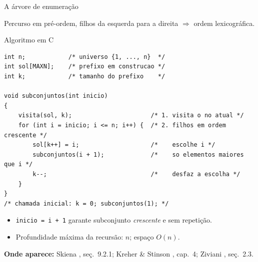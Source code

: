 \documentclass[aspectratio=169]{beamer}
\newcommand{\fonte}[1]{%
  \par\vspace{1pt}%
  {\tiny\color{gray!30!black}\textbf{Onde aparece:} #1\par}}
\begin{document}
\begin{frame}{A árvore de enumeração}
  \begin{center}
  \end{center}
  \begin{center}\small
    Percurso em pré-ordem, filhos da esquerda para a direita $\Rightarrow$ ordem lexicográfica.
  \end{center}
\end{frame}

\begin{frame}[fragile]{Algoritmo em C}
\begin{lstlisting}[style=estiloCmini]
int n;            /* universo {1, ..., n}  */
int sol[MAXN];    /* prefixo em construcao */
int k;            /* tamanho do prefixo    */

void subconjuntos(int inicio)
{
    visita(sol, k);                      /* 1. visita o no atual */
    for (int i = inicio; i <= n; i++) {  /* 2. filhos em ordem crescente */
        sol[k++] = i;                    /*    escolhe i */
        subconjuntos(i + 1);             /*    so elementos maiores que i */
        k--;                             /*    desfaz a escolha */
    }
}
/* chamada inicial: k = 0; subconjuntos(1); */
\end{lstlisting}
  \begin{itemize}
    \item \texttt{inicio = i + 1} garante subconjunto \emph{crescente} e sem repetição.
    \item Profundidade máxima da recursão: $n$; espaço $O(n)$.
  \end{itemize}
  \fonte{Skiena \cite{skiena2020algorithm}, seç.~9.2.1;
    Kreher \& Stinson \cite{kreher1999combinatorial}, cap.~4;
    Ziviani \cite{ziviani2011projeto}, seç.~2.3.}
\end{frame}
\end{document}
